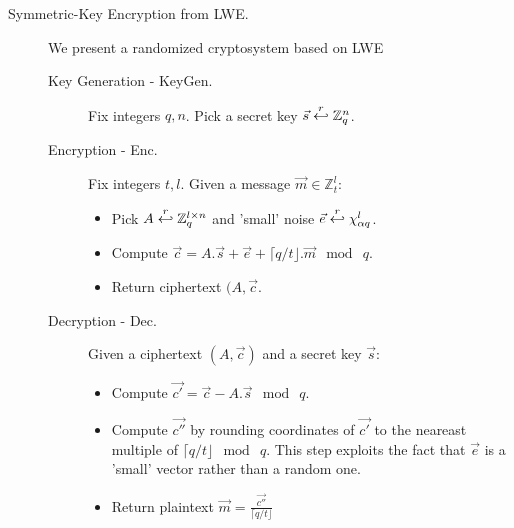 \begin{description}
        \item [Symmetric-Key Encryption from LWE.] We present a randomized cryptosystem
            based on LWE
            \begin{description}
                \item[Key Generation - KeyGen.] Fix integers $q, n$. Pick a secret key
                    $\vec{s} \stackrel{r}{\hookleftarrow} \mathbb{Z}_q^n$.
                \item [Encryption - Enc.] Fix integers $t,l$. Given a message
                    $\vec{m} \in \mathbb{Z}_t^l$:
                    \begin{itemize}
                        \item Pick $A \stackrel{r}{\hookleftarrow} \mathbb{Z}_q^{l \times n}$
                            and 'small' noise $\vec{e} \stackrel{r}{\hookleftarrow}
                            \chi_{\alpha q}^l$.
                        \item Compute $\vec{c} = A.\vec{s} + \vec{e} + \lceil
                            q/t \rfloor . \vec{m} \mod \ q$.
                        \item Return ciphertext $(A, \vec{c}$.
                    \end{itemize}
                \item [Decryption - Dec.] Given a ciphertext $(A,\vec{c})$ and a
                    secret key $\vec{s}$:
                    \begin{itemize}
                        \item Compute $\vec{c'} = \vec{c} - A.\vec{s} \mod \ q$.
                        \item Compute $\vec{c''}$ by rounding coordinates of
                            $\vec{c'}$ to the neareast multiple of $\lceil q/t
                            \rfloor \mod \ q$. This step exploits the fact that
                            $\vec{e}$ is a 'small' vector rather than a random
                            one.
                        \item Return plaintext $\vec{m} =
                            \frac{\vec{c''}}{\lceil q/t \rfloor}$
                    \end{itemize}


\end{description}
\end{description}
